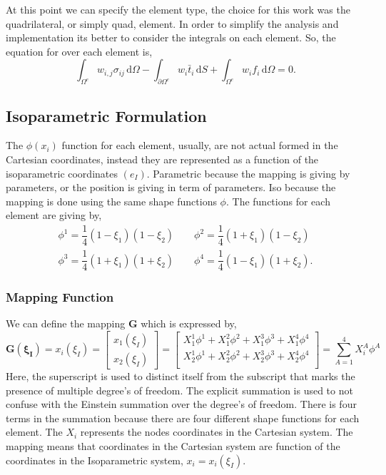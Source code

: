 \documentclass[11pt, a4paper]{article}
\numberwithin{equation}{section}
\begin{document}
At this point we can specify the element type, the choice for this work was the quadrilateral, or simply quad, element. In order to simplify the analysis and implementation its better to consider the integrals on each element. So, the equation for over each element is,
\begin{equation}
\int_{\Omega^e} w_{i,j}  \sigma_{ij} \, \mathrm{d}\Omega
- \int_{\partial \Omega^e} w_i \bar{t}_i \, \mathrm{d}S+\int_{\Omega^e} w_i f_i \, \mathrm{d}\Omega = 0.
\end{equation}

\subsection{Isoparametric Formulation}

The $\phi(x_i)$ function for each element, usually, are not actual formed in the Cartesian coordinates, instead they are represented as a function of the isoparametric coordinates $(e_I)$. Parametric because the mapping is giving by parameters, or the position is giving in term of parameters. Iso because the mapping is done using the same shape functions $\phi$. The functions for each element are giving by,
\begin{align*}
\phi^1 = \dfrac{1}{4} (1-\xi_1)(1-\xi_2) \qquad \phi^2 = \dfrac{1}{4} (1 + \xi_1)(1-\xi_2) \\
\phi^3= \dfrac{1}{4} (1+\xi_1)(1+\xi_2) \qquad \phi^4 = \dfrac{1}{4} (1 - \xi_1)(1+\xi_2).
\end{align*}


\subsubsection{Mapping Function}

We can define the mapping $\mathbf{G}$ which is expressed by,
\begin{equation*}
\mathbf{G(\xi_I)} = x_i(\xi_I) =
\begin{bmatrix}
x_1 (\xi_I) \\
x_2 (\xi_I)
\end{bmatrix} = 
\begin{bmatrix}
X_1^1 \phi^1 + X_1^2 \phi^2+ X_1^3 \phi^3 + X_1^4 \phi^4 \\[0.2cm]
X_2^1 \phi^1 + X_2^2 \phi^2+ X_2^3 \phi^3 + X_2^4 \phi^4 \\
 \end{bmatrix} = \sum_{A=1}^4
X^A_i \phi^A
\end{equation*}
Here, the superscript is used to distinct itself from the subscript that marks the presence of multiple degree's of freedom. The explicit summation is used to not confuse with the Einstein summation over the degree's of freedom. There is four terms in the summation because there are four different shape functions for each element. The $X_i$ represents the nodes coordinates in the Cartesian system. The mapping means that coordinates in the Cartesian system are function of the coordinates in the Isoparametric system, $x_i = x_i(\xi_I)$.
\end{document}
